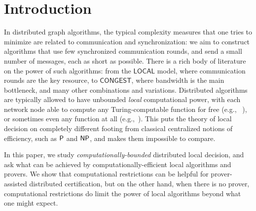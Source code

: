 \section{Introduction}
\label{sec:intro}


%
%
%


In distributed graph algorithms, the typical complexity measures that one tries to minimize are related to communication and synchronization: we aim to construct algorithms that use few synchronized communication rounds, and send a small number of messages, each as short as possible. There is a rich body of literature on the power of such algorithms: from the $\mathsf{LOCAL}$ model,
where communication rounds are the key resource, to $\mathsf{CONGEST}$, where bandwidth is the main bottleneck,
and many other combinations and variations.
Distributed algorithms are typically allowed to have unbounded \emph{local} computational power,
with each network node able to compute any Turing-computable function for free (e.g., ~\cite{fraigniaud2013can,fraigniaud2013towards}), or sometimes even any function at all (e.g.,~\cite{NS95}).
This puts the theory of local decision on completely different footing from classical centralized notions of efficiency, such as ${\mathsf{P}}$ and ${\mathsf{NP}}$, and makes them impossible to compare.

In this paper, we study \emph{computationally-bounded} distributed local decision, and ask what can be achieved by computationally-efficient local algorithms and provers.
We show that computational restrictions can be {helpful} for prover-assisted distributed certification, but on the other hand,
when there is no prover,
computational restrictions
do limit the power of local algorithms beyond what one might expect.

